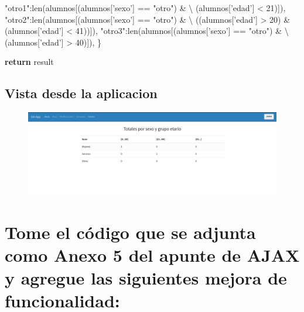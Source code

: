 \documentclass[12pt]{extarticle}
\newenvironment{Shaded}{}{}
\newcommand{\DecValTok}[1]{\textcolor[rgb]{0.25,0.63,0.44}{{#1}}}
\newcommand{\StringTok}[1]{\textcolor[rgb]{0.25,0.44,0.63}{{#1}}}
\newcommand{\NormalTok}[1]{{#1}}
\newcommand{\ControlFlowTok}[1]{\textcolor[rgb]{0.00,0.44,0.13}{\textbf{{#1}}}}
\newcommand{\OperatorTok}[1]{\textcolor[rgb]{0.40,0.40,0.40}{{#1}}}
\newcommand{\BuiltInTok}[1]{{#1}}
\begin{document}
\begin{Shaded}
\begin{Highlighting}[]
        \StringTok{"otro1"}\NormalTok{:}\BuiltInTok{len}\NormalTok{(alumnos[(alumnos[}\StringTok{'sexo'}\NormalTok{] }\OperatorTok{==} \StringTok{"otro"}\NormalTok{) }\OperatorTok{&} \OperatorTok{\textbackslash{}}
\NormalTok{                            (alumnos[}\StringTok{'edad'}\NormalTok{] }\OperatorTok{<} \DecValTok{21}\NormalTok{)]),}
        \StringTok{"otro2"}\NormalTok{:}\BuiltInTok{len}\NormalTok{(alumnos[(alumnos[}\StringTok{'sexo'}\NormalTok{] }\OperatorTok{==} \StringTok{"otro"}\NormalTok{) }\OperatorTok{&} \OperatorTok{\textbackslash{}}
\NormalTok{                            ((alumnos[}\StringTok{'edad'}\NormalTok{] }\OperatorTok{>} \DecValTok{20}\NormalTok{) }\OperatorTok{&}\NormalTok{ (alumnos[}\StringTok{'edad'}\NormalTok{] }\OperatorTok{<} \DecValTok{41}\NormalTok{))]),}
        \StringTok{"otro3"}\NormalTok{:}\BuiltInTok{len}\NormalTok{(alumnos[(alumnos[}\StringTok{'sexo'}\NormalTok{] }\OperatorTok{==} \StringTok{"otro"}\NormalTok{) }\OperatorTok{&} \OperatorTok{\textbackslash{}}
\NormalTok{                            (alumnos[}\StringTok{'edad'}\NormalTok{] }\OperatorTok{>} \DecValTok{40}\NormalTok{)]),}
\NormalTok{    \}}

    \ControlFlowTok{return}\NormalTok{ result}
\end{Highlighting}
\end{Shaded}

\subsection{Vista desde la aplicacion}\label{vista-desde-la-aplicacion}

\begin{figure}
\centering
\includegraphics{images/totales.png}
\caption{}
\end{figure}

    \section{Tome el código que se adjunta como Anexo 5 del apunte de AJAX y
agregue las siguientes mejora de
funcionalidad:}\label{tome-el-cuxf3digo-que-se-adjunta-como-anexo-5-del-apunte-de-ajax-y-agregue-las-siguientes-mejora-de-funcionalidad}
\end{document}

